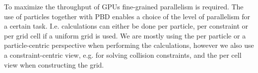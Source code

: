 To maximize the throughput of GPUs fine-grained
parallelism is required. The use of particles together with PBD enables a
choice of the level of parallelism for a certain task. I.e. calculations can
either be done per particle, per constraint or per grid cell if a uniform grid
is used. We are mostly using the per particle or a particle-centric perspective
when performing the calculations, however we also use a constraint-centric
view, e.g. for solving collision constraints, and the per cell view when
constructing the grid.
